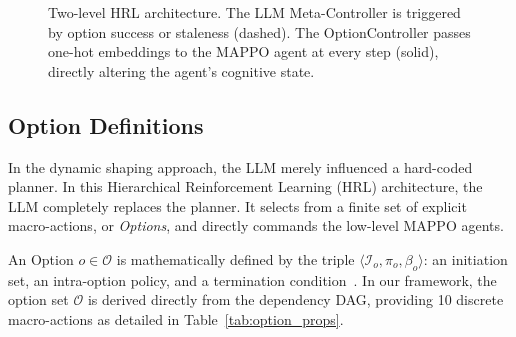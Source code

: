 \begin{figure}[H]
\caption[Two-Level HRL Architecture]{Two-level HRL architecture. The LLM Meta-Controller is triggered by option success or staleness (dashed). The OptionController passes one-hot embeddings to the MAPPO agent at every step (solid), directly altering the agent's cognitive state.}
\label{fig:hrl_system_flow}
\end{figure}


\subsection{Option Definitions}
\label{sec:option_defs}

In the dynamic shaping approach, the LLM merely influenced a hard-coded planner. In this Hierarchical Reinforcement Learning (HRL) architecture, the LLM completely replaces the planner. It selects from a finite set of explicit macro-actions, or \emph{Options}, and directly commands the low-level MAPPO agents.

An Option $o\in\mathcal{O}$ is mathematically defined by the triple $\langle \mathcal{I}_o, \pi_o, \beta_o \rangle$: an initiation set, an intra-option policy, and a termination condition~\parencite{Sutton_Precup_Singh_1999}.
In our framework, the option set $\mathcal{O}$ is derived directly from the dependency DAG, providing 10 discrete macro-actions as detailed in Table~\ref{tab:option_props}.

